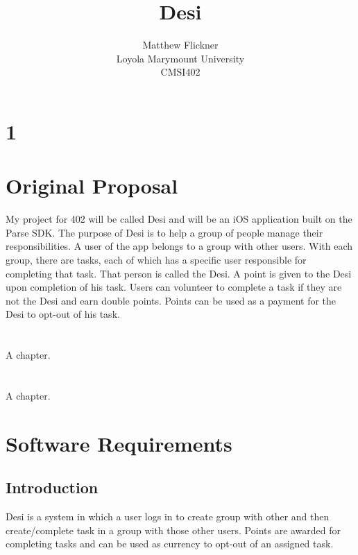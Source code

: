 \documentclass[11pt, a4paper]{report}
\title{Desi}
\author{Matthew Flickner \\ Loyola Marymount University\\ CMSI402}
\providecommand\phantomsection{}
\begin{document}
\clearpage
\phantomsection
{}
\maketitle


\tableofcontents
\newpage
 
\chapter{1}

\chapter{Original Proposal}
My project for 402 will be called Desi and will be an iOS application built on the Parse SDK. The purpose of Desi is to help a group of people manage their responsibilities. A user of the app belongs to a group with other users. With each group, there are tasks, each of which has a specific user responsible for completing that task. That person is called the Desi. A point is given to the Desi upon completion of his task. Users can volunteer to complete a task if they are not the Desi and earn double points. Points can be used as a payment for the Desi to opt-out of his task.

\chapter{}
 A chapter.

\chapter{}
 A chapter.

\chapter{Software Requirements}

\section{Introduction}
Desi is a system in which a user logs in to create group with other and then create/complete task in a group with those other users. Points are awarded for completing tasks and can be used as currency to opt-out of an assigned task.
\end{document}
